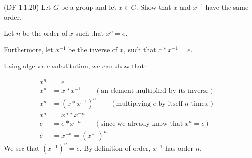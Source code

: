 \begin{problem}{\textsf{(DF 1.1.20)}}
  Let $G$ be a group and let $x \in G$.  Show that $x$ and $x^{-1}$ have the same 
  order.
\end{problem}
\begin{Answer}
  Let $n$ be the order of $x$ such that $x^{n} = e$.
  
  \noindent
  Furthermore, let $x^{-1}$ be the inverse of $x$, such that $x * x^{-1} = e$.
  
  \noindent
  Using algebraic substitution, we can show that:

\begin{align*}
  x ^ n &= e \\
  x^n &= x * x^{-1}\qquad (\text{an element multiplied by its inverse})\\
  x^{n} &= {(x * x^{-1})}^{n}\qquad (\text{multiplying $e$ by itself $n$ times.})\\
  x^{n} &= x^{n} * x^{-n} \\
  e &= e * x^{-n}\qquad (\text{since we already know that $x^{n} = e$})\\
  e &= x^{-n} = {(x^{-1})}^{n}
\end{align*}
We see that ${(x^{-1})}^{n} = e$. By definition of order, $x^{-1}$ has order $n$.
\end{Answer}
